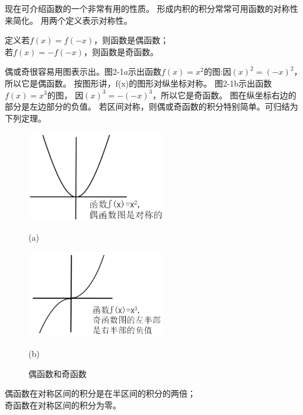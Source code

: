 现在可介绍函数的一个非常有用的性质。
形成内积的积分常常可用函数的对称性来简化。
用两个定义表示对称性。

\begin{definition}[奇偶性]
    定义若$f(x)=f(-x)$，则函数是偶函数； \\
    若$f(x)=-f(-x)$，则函数是奇函数。
\end{definition}

偶或奇很容易用图表示出。图2-1$a$示出函数$f(x)=x^2$的图:因$(x)^2=(-x)^2$，所以它是偶函数。
按图形讲，f(x)的图形对纵坐标对称。
图2-1b示出函数$f(x)=x^3$的图， 因$(x)^3=-(-x)^3$，所以它是奇函数。
图在纵坐标右边的部分是左边部分的负值。
若区间对称，则偶或奇函数的积分特别简单。可归结为下列定理。

\begin{figure}[htbp]
    \centering
    \begin{minipage}[t]{0.48\textwidth}
    \centering
    \includegraphics[width=6cm]{./fig/2-1a.png}
    
    (a)
    \end{minipage}
    \begin{minipage}[t]{0.48\textwidth}
    \centering
    \includegraphics[width=6cm]{./fig/2-1b.png}
    
    (b)
    \end{minipage}
    \caption{偶函数和奇函数}
    \end{figure}

\begin{theorem}
    偶函数在对称区间的积分是在半区间的积分的两倍； \\
    奇函数在对称区间的积分为零。
\end{theorem}

